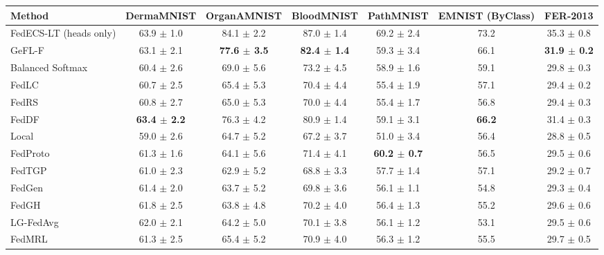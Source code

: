\begin{tabular}{lcccccc}
\toprule
Method & DermaMNIST & OrganAMNIST & BloodMNIST & PathMNIST & EMNIST (ByClass) & FER-2013\\
\midrule
FedECS-LT (heads only) & 63.9 $\pm$ 1.0 & 84.1 $\pm$ 2.2 & 87.0 $\pm$ 1.4 & 69.2 $\pm$ 2.4 & 73.2 & 35.3 $\pm$ 0.8\\
GeFL-F & 63.1 $\pm$ 2.1 & \textbf{77.6 $\pm$ 3.5} & \textbf{82.4 $\pm$ 1.4} & 59.3 $\pm$ 3.4 & 66.1 & \textbf{31.9 $\pm$ 0.2}\\
Balanced Softmax & 60.4 $\pm$ 2.6 & 69.0 $\pm$ 5.6 & 73.2 $\pm$ 4.5 & 58.9 $\pm$ 1.6 & 59.1 & 29.8 $\pm$ 0.3\\
FedLC & 60.7 $\pm$ 2.5 & 65.4 $\pm$ 5.3 & 70.4 $\pm$ 4.4 & 55.4 $\pm$ 1.9 & 57.1 & 29.4 $\pm$ 0.2\\
FedRS & 60.8 $\pm$ 2.7 & 65.0 $\pm$ 5.3 & 70.0 $\pm$ 4.4 & 55.4 $\pm$ 1.7 & 56.8 & 29.4 $\pm$ 0.3\\
FedDF & \textbf{63.4 $\pm$ 2.2} & 76.3 $\pm$ 4.2 & 80.9 $\pm$ 1.4 & 59.1 $\pm$ 3.1 & \textbf{66.2} & 31.4 $\pm$ 0.3\\
Local & 59.0 $\pm$ 2.6 & 64.7 $\pm$ 5.2 & 67.2 $\pm$ 3.7 & 51.0 $\pm$ 3.4 & 56.4 & 28.8 $\pm$ 0.5\\
FedProto & 61.3 $\pm$ 1.6 & 64.1 $\pm$ 5.6 & 71.4 $\pm$ 4.1 & \textbf{60.2 $\pm$ 0.7} & 56.5 & 29.5 $\pm$ 0.6\\
FedTGP & 61.0 $\pm$ 2.3 & 62.9 $\pm$ 5.2 & 68.8 $\pm$ 3.3 & 57.7 $\pm$ 1.4 & 57.1 & 29.2 $\pm$ 0.7\\
FedGen & 61.4 $\pm$ 2.0 & 63.7 $\pm$ 5.2 & 69.8 $\pm$ 3.6 & 56.1 $\pm$ 1.1 & 54.8 & 29.3 $\pm$ 0.4\\
FedGH & 61.8 $\pm$ 2.5 & 63.8 $\pm$ 4.8 & 70.2 $\pm$ 4.0 & 56.4 $\pm$ 1.3 & 55.2 & 29.6 $\pm$ 0.6\\
LG-FedAvg & 62.0 $\pm$ 2.1 & 64.2 $\pm$ 5.0 & 70.1 $\pm$ 3.8 & 56.1 $\pm$ 1.2 & 53.1 & 29.5 $\pm$ 0.6\\
FedMRL & 61.3 $\pm$ 2.5 & 65.4 $\pm$ 5.2 & 70.9 $\pm$ 4.0 & 56.3 $\pm$ 1.2 & 55.5 & 29.7 $\pm$ 0.5\\
\bottomrule
\end{tabular}
